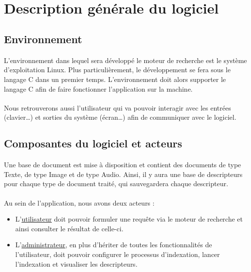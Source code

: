 \documentclass[../main.tex]{subfiles}
\begin{document}
\section{Description générale du logiciel}
\subsection{Environnement}

\paragraph{}
L’environnement dans lequel sera développé le moteur de recherche est le système d’exploitation Linux. Plus particulièrement, le développement se fera sous le langage C dans un premier temps. L’environnement doit alors supporter le langage C afin de faire fonctionner l’application sur la machine.

\paragraph{}
Nous retrouverons aussi l’utilisateur qui va pouvoir interagir avec les entrées (clavier…) et sorties du système (écran…) afin de communiquer avec le logiciel.

\subsection{Composantes du logiciel et acteurs}

\paragraph{}
Une base de document est mise à disposition et contient des documents de type Texte, de type Image et de type Audio. Ainsi, il y aura une base de descripteurs pour chaque type de document traité, qui sauvegardera chaque descripteur.

\paragraph{}
Au sein de l’application, nous avons deux acteurs :
\begin{itemize}
    \item L’\underline{utilisateur} doit pouvoir formuler une requête via le moteur de recherche et ainsi consulter le résultat de celle-ci.
    \item L’\underline{administrateur}, en plus d’hériter de toutes les fonctionnalités de l’utilisateur, doit pouvoir configurer le processus d’indexation, lancer l’indexation et visualiser les descripteurs.
\end{itemize}
\end{document}
